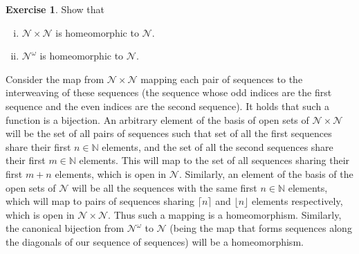 \documentclass{article}
\theoremstyle{definition}
\newtheorem{exer}{Exercise}[section]
\newcommand{\N}{\mathbb{N}}
\newlength{\defparindent}
\newenvironment{answer}
    {\begin{mdframed}[backgroundcolor=gray!15, linewidth=0pt] \setlength{\parindent}{\defparindent}}
    {\end{mdframed}}
\begin{document}
\begin{exer}
    Show that 
    \begin{enumerate}[(i)]
        \item $\mathcal{N} \times \mathcal{N}$ is homeomorphic to $\mathcal{N}$.
        \item $\mathcal{N}^\omega$ is homeomorphic to $\mathcal{N}$.
    \end{enumerate}
    \begin{answer}
        Consider the map from $\mathcal{N} \times \mathcal{N}$ mapping each pair of sequences to the interweaving of these sequences (the sequence whose odd indices are the first sequence and the even indices are the second sequence). It holds that such a function is a bijection. An arbitrary element of the basis of open sets of $\mathcal{N} \times \mathcal{N}$ will be the set of all pairs of sequences such that set of all the first sequences share their first $n \in \N$ elements, and the set of all the second sequences share their first $m \in \N$ elements. This will map to the set of all sequences sharing their first $m + n$ elements, which is open in $\mathcal{N}$. Similarly, an element of the basis of the open sets of $\mathcal{N}$ will be all the sequences with the same first $n \in \N$ elements, which will map to pairs of sequences sharing $\lceil n \rceil$ and $\lfloor n \rfloor$ elements respectively, which is open in $\mathcal{N} \times \mathcal{N}$. Thus such a mapping is a homeomorphism. Similarly, the canonical bijection from $\mathcal{N}^\omega$ to $\mathcal{N}$ (being the map that forms sequences along the diagonals of our sequence of sequences) will be a homeomorphism.
    \end{answer}
\end{exer}

\newpage
\end{document}
